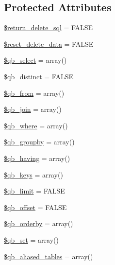 \subsection*{Protected Attributes}
\begin{DoxyCompactItemize}
\item 
\hyperlink{class_c_i___d_b__query__builder_aee0c1cc88062e1b49fe9e057bfb288e6}{\$return\+\_\+delete\+\_\+sql} = F\+A\+L\+S\+E
\item 
\hyperlink{class_c_i___d_b__query__builder_aaeed877e8b1faeddaecaec6c890567ef}{\$reset\+\_\+delete\+\_\+data} = F\+A\+L\+S\+E
\item 
\hyperlink{class_c_i___d_b__query__builder_a0ffc5292702e6f9ffbd830f149762e87}{\$qb\+\_\+select} = array()
\item 
\hyperlink{class_c_i___d_b__query__builder_ab25ffde080220f90531e2c7fb63dae61}{\$qb\+\_\+distinct} = F\+A\+L\+S\+E
\item 
\hyperlink{class_c_i___d_b__query__builder_ae3b7c9b5e80df14e86603e12e5af7878}{\$qb\+\_\+from} = array()
\item 
\hyperlink{class_c_i___d_b__query__builder_a21c59bf512aeedb532e61ef101aefc17}{\$qb\+\_\+join} = array()
\item 
\hyperlink{class_c_i___d_b__query__builder_afc34268c5a4d034aa3802e3310ec9419}{\$qb\+\_\+where} = array()
\item 
\hyperlink{class_c_i___d_b__query__builder_a93e14f322d0e6e6cbc3eebe21ce6a034}{\$qb\+\_\+groupby} = array()
\item 
\hyperlink{class_c_i___d_b__query__builder_a3f6570da7e71b44280a01265f18e1a54}{\$qb\+\_\+having} = array()
\item 
\hyperlink{class_c_i___d_b__query__builder_a08fe63db41a3e804650206850175c1dc}{\$qb\+\_\+keys} = array()
\item 
\hyperlink{class_c_i___d_b__query__builder_a383e4f5a10c762a271105c85b3ebca61}{\$qb\+\_\+limit} = F\+A\+L\+S\+E
\item 
\hyperlink{class_c_i___d_b__query__builder_aa45418e873986d0f6e6bc768ea5567e5}{\$qb\+\_\+offset} = F\+A\+L\+S\+E
\item 
\hyperlink{class_c_i___d_b__query__builder_a8e856c95a5ca3df7c7deba3782182a3e}{\$qb\+\_\+orderby} = array()
\item 
\hyperlink{class_c_i___d_b__query__builder_a377913806717a7b6bcd35ed1df5ac072}{\$qb\+\_\+set} = array()
\item 
\hyperlink{class_c_i___d_b__query__builder_a1a27aa0ceada8a74b23613bf3cd04e65}{\$qb\+\_\+aliased\+\_\+tables} = array()

\end{DoxyCompactItemize}

